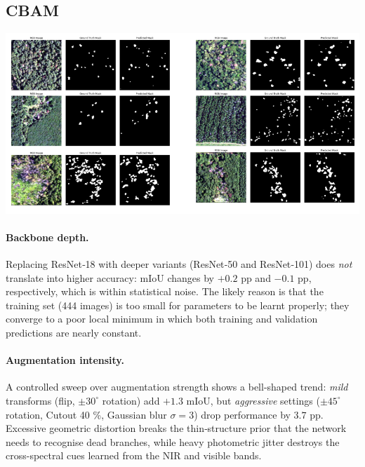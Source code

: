 \subsection{CBAM}
\includegraphics[width=1\linewidth]{figs/DeepLabExample.png}
\paragraph{Backbone depth.}
Replacing ResNet‐18 with deeper variants (ResNet‐50 and ResNet‐101) does \emph{not}
translate into higher accuracy: mIoU changes by \(+0.2\) pp and \(-0.1\) pp,
respectively, which is within statistical noise.
The likely reason is that the training set (444 images) is too small for parameters to be learnt properly; they converge to a poor local minimum in which both training and validation predictions are nearly constant.

\paragraph{Augmentation intensity.}
A controlled sweep over augmentation strength shows a bell-shaped trend:
\emph{mild} transforms (flip, \(\pm30^\circ\) rotation) add \(+\!1.3\) mIoU, but \emph{aggressive} settings (\(\pm45^\circ\) rotation, Cutout 40 \%, Gaussian blur \(\sigma{=}3\)) drop performance by \(3.7\) pp.
Excessive geometric distortion breaks the thin‐structure prior that the
network needs to recognise dead branches, while heavy photometric jitter
destroys the cross-spectral cues learned from the NIR and visible bands.

